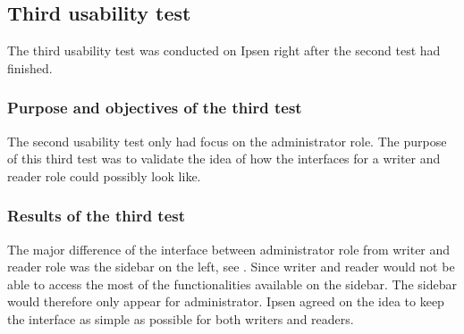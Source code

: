 \documentclass[../../master.tex]{subfiles}
\begin{document}
\subsection{Third usability test}\label{thirdtest}
The third usability test was conducted on Ipsen right after the second test had finished.

\subsubsection*{Purpose and objectives of the third test}
The second usability test only had focus on the administrator role.
The purpose of this third test was to validate the idea of how the interfaces for a writer and reader role could possibly look like.

\subsubsection*{Results of the third test}
The major difference of the interface between administrator role from writer and reader role was the sidebar on the left, see .
Since writer and reader would not be able to access the most of the functionalities available on the sidebar.
The sidebar would therefore only appear for administrator.
Ipsen agreed on the idea to keep the interface as simple as possible for both writers and readers.
\end{document}
